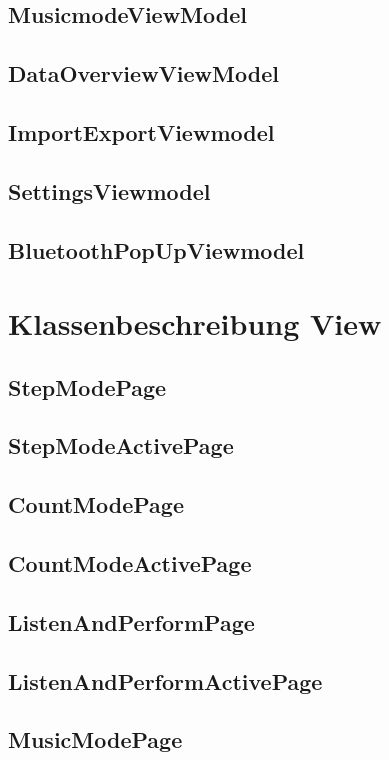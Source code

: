 \documentclass[a4paper,12pt]{article}
\begin{document}
\subsection{MusicmodeViewModel}

\subsection{DataOverviewViewModel}

\subsection{ImportExportViewmodel}

\subsection{SettingsViewmodel}

\subsection{BluetoothPopUpViewmodel}

\section{Klassenbeschreibung View}
\subsection{StepModePage}
\subsection{StepModeActivePage}
\subsection{CountModePage}
\subsection{CountModeActivePage}
\subsection{ListenAndPerformPage}
\subsection{ListenAndPerformActivePage}
\subsection{MusicModePage}
\end{document}
